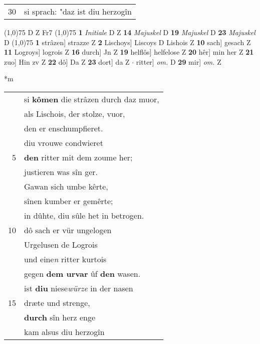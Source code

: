\documentclass[8pt,a4paper,notitlepage]{article}
\begin{document}
\begin{table}[ht]
\begin{minipage}[t]{0.5\linewidth}
\begin{tabular}{rl}
30 & si sprach: "daz ist diu herzogîn\\ 
\end{tabular}
\scriptsize
\line(1,0){75} \newline
D Z Fr7 \newline
\line(1,0){75} \newline
\textbf{1} \textit{Initiale} D Z  \textbf{14} \textit{Majuskel} D  \textbf{19} \textit{Majuskel} D  \textbf{23} \textit{Majuskel} D  \newline
\line(1,0){75} \newline
\textbf{1} strâzen] strazze Z \textbf{2} Lischoys] Liscoys D Lishois Z \textbf{10} sach] gesach Z \textbf{11} Logroys] logrois Z \textbf{16} durch] Jn Z \textbf{19} helflôs] helfelose Z \textbf{20} hêr] min her Z \textbf{21} zuo] Hin zv Z \textbf{22} dô] Da Z \textbf{23} dort] da Z  $\cdot$ ritter] \textit{om.} D \textbf{29} mir] \textit{om.} Z \newline
\end{minipage}
\hspace{0.5cm}
\begin{minipage}[t]{0.5\linewidth}
\small
\begin{center}*m
\end{center}
\begin{tabular}{rl}
 & si \textbf{kômen} die strâzen durch daz muor,\\ 
 & als Lischois, der stolze, vuor,\\ 
 & den er enschumpfieret.\\ 
 & diu vrouwe condwieret\\ 
5 & \textbf{den} ritter mit dem zoume her;\\ 
 & justieren was sîn ger.\\ 
 & Gawan sich umbe kêrte,\\ 
 & sînen kumber er gemêrte;\\ 
 & in dûhte, diu sûle het in betrogen.\\ 
10 & dô sach er vür ungelogen\\ 
 & Urgelusen de Logrois\\ 
 & und eine\textit{n} ritter kurtois\\ 
 & gegen \textbf{dem urvar} ûf \textbf{den} wasen.\\ 
 & ist \textbf{diu} niese\textit{würze} in der nasen\\ 
15 & dræte und strenge,\\ 
 & \textbf{durch} sîn herz enge\\ 
 & kam alsus diu herzogîn\\ 

\end{tabular}
\end{minipage}
\end{table}
\end{document}
